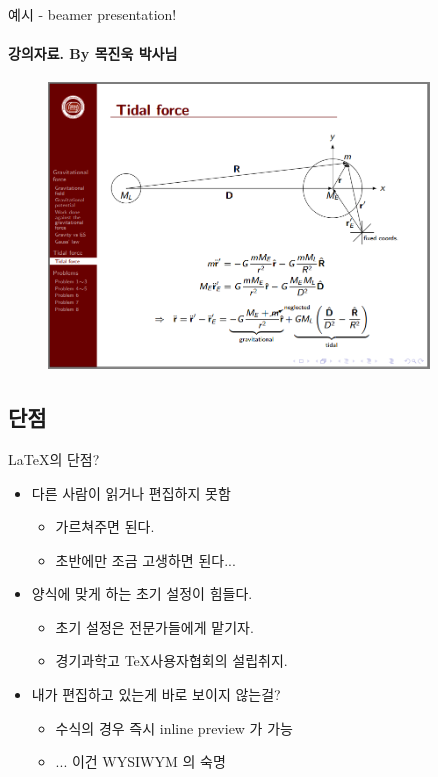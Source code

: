 \documentclass[12pt]{beamer}
\begin{document}
\begin{frame}{예시 - beamer presentation!}
	\framesubtitle{강의자료. By 목진욱 박사님}
	\begin{figure}[h]
		\centering
		\includegraphics[width=0.9\textwidth]{ex_physicsseminar.png}
	\end{figure}
\end{frame}
\subsection{단점}
\begin{frame}{\LaTeX 의 단점?}
	\begin{itemize}
		\item 다른 사람이 읽거나 편집하지 못함
		\pause
		\begin{itemize}
			\item 가르쳐주면 된다. 
			\item 초반에만 조금 고생하면 된다...
		\end{itemize}
		\pause
		\item 양식에 맞게 하는 초기 설정이 힘들다. 
		\pause
		\begin{itemize}
			\item 초기 설정은 전문가들에게 맡기자.
			\item 경기과학고 \TeX 사용자협회의 설립취지.
		\end{itemize}
		\pause
		\item 내가 편집하고 있는게 바로 보이지 않는걸?
		\pause
		\begin{itemize}
			\item 수식의 경우 즉시 inline preview 가 가능
			\item ... 이건 WYSIWYM 의 숙명
		\end{itemize}
	\end{itemize}
\end{frame}
\end{document}
